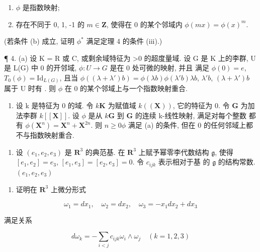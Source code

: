 \begin{enumerate}
\def\labelenumi{(\alph{enumi})}
\item
  \(\phi\) 是指数映射;
\item
  存在不同于 0, 1, -1 的 \(m \in \mathbf{Z}\), 使得在 0 的某个邻域内 \(\phi(mx) = \phi(x)^m\).
\end{enumerate}

(若条件 (b) 成立, 证明 \(\phi^{*}\) 满足定理 4 的条件 (iii).)

¶ 4. (a) 设 K = R 或 C, 或剩余域特征为 \textgreater0 的超度量域. 设 G 是 K 上的李群, U 是 L(G) 中 0 的开邻域, \(\phi: U \to G\) 是在 0 处可微的映射, 并且
满足 \(\phi(0) = e\), \(T_0(\phi) = \mathrm{Id}_{L(G)}\), 且当 \(\phi((\lambda + \lambda')b) = \phi(\lambda b)\phi(\lambda'b)\)\(\lambda b\), \(\lambda'b\), \((\lambda + \lambda')b\) 属于 U 时有 . 则 \(\phi\) 在 0 的某个邻域上与一个指数映射重合.

\begin{enumerate}
\def\labelenumi{(\alph{enumi})}
\setcounter{enumi}{1}
\tightlist
\item
  设 k 是特征为 0 的域. 令 \(k\)\(\mathbf{K}\) 为赋值域 \(k((\mathbf{X}))\), 它的特征为 0. 令 \(\mathbf{G}\) 为加法李群 \(k[[\mathbf{X}]]\). 设 \(\phi\) 是从 \(k\)\(\mathbf{G}\) 到 \(\mathbf{G}\) 的连续 k-线性映射, 满足对每个整数  都有 \(\phi(\mathbf{X}^n) = \mathbf{X}^n + \mathbf{X}^{2n}\). 则 \(n \geqslant 0\)\(\phi\) 满足 (a) 的条件, 但在 0 的任何邻域上都不与指数映射重合.
\end{enumerate}

\begin{enumerate}
\def\labelenumi{\arabic{enumi}.}
\setcounter{enumi}{4}
\tightlist
\item
  设 \((e_1, e_2, e_3)\) 是 \(\mathbf{R}^3\) 的典范基. 在 \(\mathbf{R}^3\) 上赋予幂零李代数结构 \(\mathfrak{g}\), 使得 \([e_1, e_2] = e_3\), \([e_1, e_3] = [e_2, e_3] = 0\). 令 \(c_{ijk}\) 表示相对于基  的 \(\mathfrak{g}\) 的结构常数.\((e_1, e_2, e_3)\)
\end{enumerate}

\begin{enumerate}
\def\labelenumi{(\alph{enumi})}
\tightlist
\item
  证明在 \(\mathbf{R}^3\) 上微分形式
\end{enumerate}

\[
\omega_ {1} = d x _ {1}, \quad \omega_ {2} = d x _ {2}, \quad \omega_ {3} = - x _ {1} d x _ {2} + d x _ {3}
\]

满足关系

\[
d \omega_ {k} = - \sum_ {i <   j} c _ {i j k} \omega_ {i} \wedge \omega_ {j} \quad (k = 1, 2, 3)
\]

